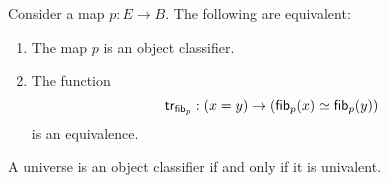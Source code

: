 \begin{prp}
  Consider a map $p:E\to B$. The following are equivalent:
  \begin{enumerate}
  \item The map $p$ is an object classifier.
  \item The function
    \begin{equation*}
      \mathsf{tr}_{\mathsf{fib}_{p}}:(x=y)\to (\mathsf{fib}_{p}(x)\simeq\mathsf{fib}_{p}(y))
    \end{equation*}
    is an equivalence.
  \end{enumerate}
\end{prp}

\begin{cor}
  A universe is an object classifier if and only if it is univalent.
\end{cor}
